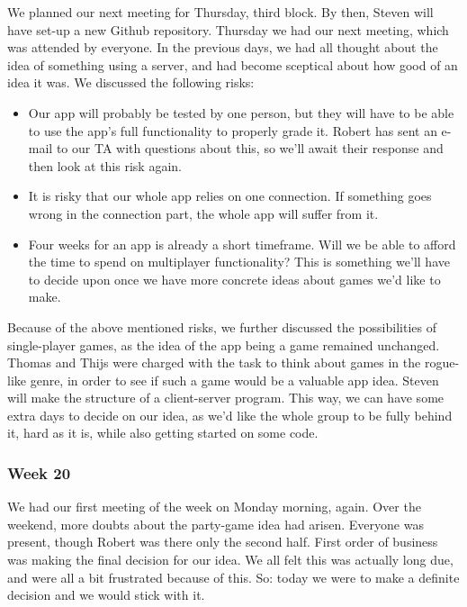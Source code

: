 \documentclass[../main.tex]{subfiles}
\begin{document}
We planned our next meeting for Thursday, third block. By then, Steven will have set-up a new Github repository.
\bigbreak\noindent
Thursday we had our next meeting, which was attended by everyone. In the previous days, we had all thought about the idea of something using a server, and had become sceptical about how good of an idea it was. We discussed the following risks:
\begin{itemize}
	\item Our app will probably be tested by one person, but they will have to be able to use the app's full functionality to properly grade it. Robert has sent an e-mail to our TA with questions about this, so we'll await their response and then look at this risk again.
		\item It is risky that our whole app relies on one connection. If something goes wrong in the connection part, the whole app will suffer from it.
		\item Four weeks for an app is already a short timeframe. Will we be able to afford the time to spend on multiplayer functionality? This is something we'll have to decide upon once we have more concrete ideas about games we'd like to make.
\end{itemize}
Because of the above mentioned risks, we further discussed the possibilities of single-player games, as the idea of the app being a game remained unchanged. Thomas and Thijs were charged with the task to think about games in the rogue-like genre, in order to see if such a game would be a valuable app idea. Steven will make the structure of a client-server program. This way, we can have some extra days to decide on our idea, as we'd like the whole group to be fully behind it, hard as it is, while also getting started on some code.


\subsubsection*{Week 20}
We had our first meeting of the week on Monday morning, again. Over the weekend, more doubts about the party-game idea had arisen. Everyone was present, though Robert was there only the second half. First order of business was making the final decision for our idea. We all felt this was actually long due, and were all a bit frustrated because of this. So: today we were to make a definite decision and we would stick with it.
\end{document}
